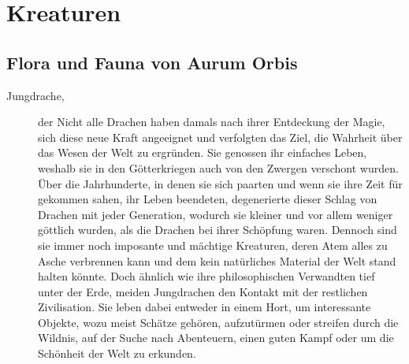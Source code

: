\documentclass[a4paper,12pt,oneside]{book}
\begin{document}
\part{Kreaturen}
\setcounter{chapter}{0}
\chapter{Flora und Fauna von Aurum Orbis}

\begin{description}

\item[Jungdrache,]der 
\newline Nicht alle Drachen haben damals nach ihrer Entdeckung der Magie, sich diese neue Kraft angeeignet und verfolgten das Ziel, die Wahrheit über das Wesen der Welt zu ergründen. Sie genossen ihr einfaches Leben, weshalb sie in den Götterkriegen auch von den Zwergen verschont wurden. Über die Jahrhunderte, in denen sie sich paarten und wenn sie ihre Zeit für gekommen sahen, ihr Leben beendeten, degenerierte dieser Schlag von Drachen mit jeder Generation, wodurch sie kleiner und vor allem weniger göttlich wurden, als die Drachen bei ihrer Schöpfung waren. Dennoch sind sie immer noch imposante und mächtige Kreaturen, deren Atem alles zu Asche verbrennen kann und dem kein natürliches Material der Welt stand halten könnte. Doch ähnlich wie ihre philosophischen Verwandten tief unter der Erde, meiden Jungdrachen den Kontakt mit der restlichen Zivilisation. Sie leben dabei entweder in einem Hort, um interessante Objekte, wozu meist Schätze gehören, aufzutürmen oder streifen durch die Wildnis, auf der Suche nach Abenteuern, einen guten Kampf oder um die Schönheit der Welt zu erkunden.


\end{description}
\end{document}
